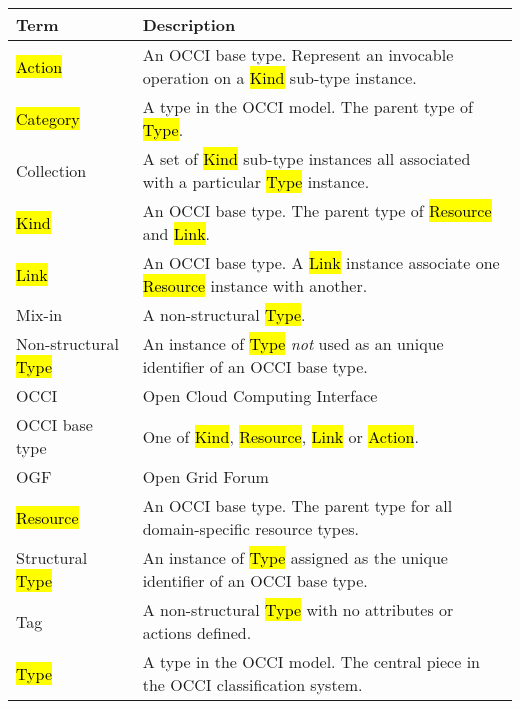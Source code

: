 \begin{tabular}{l|p{11cm}}
Term & Description \\
\hline
\hl{Action} & An OCCI base type. Represent an invocable operation on a \hl{Kind} sub-type instance. \\
\hl{Category} & A type in the OCCI model. The parent type of \hl{Type}. \\
Collection & A set of \hl{Kind} sub-type instances all associated with a particular \hl{Type} instance. \\
\hl{Kind} & An OCCI base type. The parent type of \hl{Resource} and \hl{Link}. \\
\hl{Link} & An OCCI base type. A \hl{Link} instance associate one \hl{Resource} instance with another. \\
Mix-in & A non-structural \hl{Type}. \\
Non-structural \hl{Type} & An instance of \hl{Type} {\em not} used as an unique identifier of an OCCI base type. \\
OCCI & Open Cloud Computing Interface \\
OCCI base type & One of \hl{Kind}, \hl{Resource}, \hl{Link} or \hl{Action}. \\
OGF & Open Grid Forum \\
\hl{Resource} & An OCCI base type. The parent type for all domain-specific resource types. \\
Structural \hl{Type} & An instance of \hl{Type} assigned as the unique identifier of an OCCI base type. \\
Tag & A non-structural \hl{Type} with no attributes or actions defined. \\
\hl{Type} & A type in the OCCI model. The central piece in the OCCI classification system. \\
\end{tabular}
